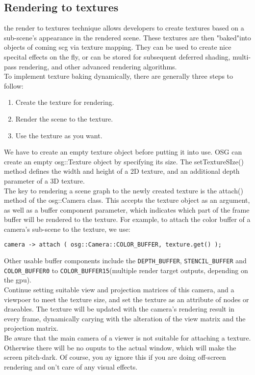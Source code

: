\documentclass[a4paper,12pt]{book}
\begin{document}
\subsection{Rendering to textures}
the render to textures technique allows developers to create textures based on a sub-scene's appearance in the rendered scene.
These textures are then "baked"into objects of coming scg via texture mapping. They can be used to create nice specital effects on the fly, or can be stored for subsequent deferred shading, multi-pass rendering, and other advanced rendering algorithms.\\
To implement texture baking dynamically, there are generally three steps to follow:
\begin{enumerate}
\item Create the texture for rendering.
\item Render the scene to the texture.
\item Use the texture as you want.
\end{enumerate}

We have to create an empty texture object before putting it into use. OSG can create an empty osg::Texture object by specifying its size. The setTextureSIze() method defines the width and height of a 2D texture, and an additional depth parameter of a 3D texture.\\

The key to rendering a scene graph to the newly created texture is the attach() method of the osg::Camera class. This accepts the texture object as an argument, as well as a buffer component parameter, which indicates which part of the frame buffer will be rendered to the texture. For example, to attach the color buffer of a camera's sub-scene to the texture, we use:
\begin{lstlisting}
camera -> attach ( osg::Camera::COLOR_BUFFER, texture.get() );
\end{lstlisting}

Other usable buffer components include the \verb|DEPTH_BUFFER|, \verb|STENCIL_BUFFER| and \verb|COLOR_BUFFER0| to \verb|COLOR_BUFFER15|(multiple render target outputs, depending on the gpu).\\
Continue setting suitable view and projection matrices of this camera, and a viewpoer to meet the texture size, and set the texture as an attribute of nodes or draeables. The texture will be updated with the camera's rendering result in every frame, dynamically carying with the alteration of the view matrix and the projection matrix.\\
Be aware that the main camera of a viewer is not suitable for attaching a texture. Otherwise there will be no ouputs to the actual window, which will make the screen pitch-dark. Of course, you ay ignore this if you are doing off-screen rendering and on't care of any visual effects.
\end{document}
